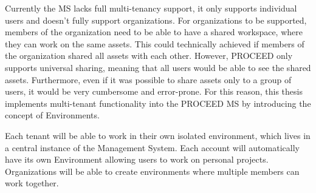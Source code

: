 Currently the MS lacks full multi-tenancy support, it only supports individual users and
doesn't fully support organizations.
For organizations to be supported, members of the organization need to be able to have a
shared workspace, where they can work on the same assets. 
This could technically achieved if members of the organization shared all assets with
each other.
However, PROCEED only supports universal sharing, meaning that all users would be able to
see the shared assets.
Furthermore, even if it was possible to share assets only to a group of users, it would be
very cumbersome and error-prone.
For this reason, this thesis implements multi-tenant functionality into the PROCEED MS by introducing the concept of Environments. 

Each tenant will be able to work in their own isolated environment, which lives in a central instance of the Management System. 
Each account will automatically have its own Environment allowing users to work on
personal projects. 
Organizations will be able to create environments where multiple members can work together.

